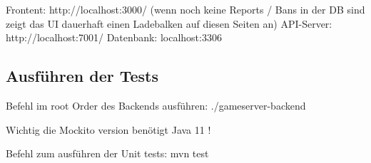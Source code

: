 Frontent: http://localhost:3000/
(wenn noch keine Reports / Bans in der DB sind zeigt das UI dauerhaft einen Ladebalken auf diesen Seiten an)
\newline
API-Server: http://localhost:7001/
\newline
Datenbank: localhost:3306



\subsection{Ausführen der Tests}

Befehl im root Order des Backends ausführen: ./gameserver-backend

Wichtig die Mockito version benötigt Java 11 !

Befehl zum ausführen der Unit tests: mvn test